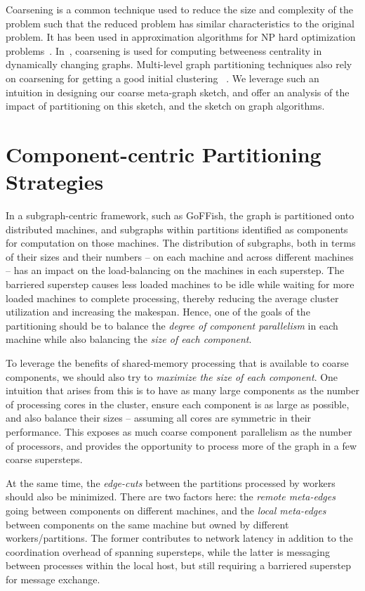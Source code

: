 \documentclass[10pt,conference, compsocconf]{IEEEtran}
\begin{document}
Coarsening is a common technique used to reduce the size and complexity of the problem such that the reduced problem has similar characteristics to the original problem. It has been used in approximation algorithms for NP hard optimization problems~\cite{klein2010approximation}.  In~\cite{chernoskutov2015heuristic}, coarsening is used for computing betweeness centrality in dynamically changing graphs. 
Multi-level graph partitioning techniques also rely on coarsening for getting a good initial clustering ~\cite{metis}.  We leverage such an intuition in designing our coarse meta-graph sketch, and offer an analysis of the impact of partitioning on this sketch, and the sketch on graph algorithms.
\section{Component-centric Partitioning Strategies}\label{sec:partition}
In a subgraph-centric framework, such as GoFFish,  the graph is partitioned onto distributed machines, and subgraphs within partitions identified as components for computation on those machines. The distribution of subgraphs, both in terms of their sizes and their numbers -- on each machine and across different machines -- has an impact on the load-balancing on the machines in each superstep. The barriered superstep causes less loaded machines to be idle while waiting for more loaded machines to complete processing, thereby reducing the average cluster utilization and increasing the makespan. Hence, one of the goals of the partitioning should be to balance the \emph{degree of component parallelism} in each machine while also balancing the \emph{size of each component}. 

To leverage the benefits of shared-memory processing that is available to coarse components, we should also try to \emph{maximize the size of each component}. One intuition that arises from this is to have as many large components as the number of processing cores in the cluster, ensure each component is as large as possible, and also balance their sizes -- assuming all cores are symmetric in their performance. This exposes as much coarse component parallelism as the number of processors, and provides the opportunity to process more of the graph in a few coarse supersteps. 

At the same time, the \emph{edge-cuts} between the partitions processed by workers should also be minimized. There are two factors here: the \emph{remote meta-edges} going between components on different machines, and the \emph{local meta-edges} between components on the same machine but owned by different workers/partitions. The former contributes to network latency in addition to the coordination overhead of spanning supersteps, while the latter is messaging between processes within the local host, but still requiring a barriered superstep for message exchange.
\end{document}
